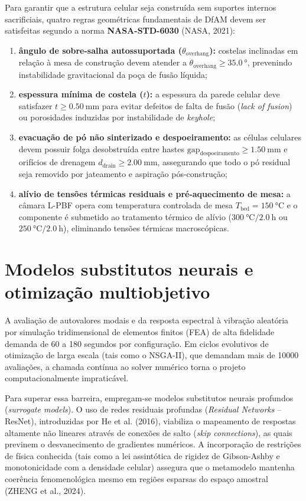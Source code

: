 Para garantir que a estrutura celular seja construída sem suportes internos sacrificiais, quatro regras geométricas fundamentais de DfAM devem ser satisfeitas segundo a norma \textbf{NASA-STD-6030} (NASA, 2021):
\begin{enumerate}
  \item \textbf{ângulo de sobre-salha autossuportada ($\theta_{\text{overhang}}$):} costelas inclinadas em relação à mesa de construção devem atender a $\theta_{\text{overhang}} \ge \SI{35.0}{\degree}$, prevenindo instabilidade gravitacional da poça de fusão líquida;
  \item \textbf{espessura mínima de costela ($t$):} a espessura da parede celular deve satisfazer $t \ge \SI{0.50}{\milli\metre}$ para evitar defeitos de falta de fusão (\textit{lack of fusion}) ou porosidades induzidas por instabilidade de \textit{keyhole};
  \item \textbf{evacuação de pó não sinterizado e despoeiramento:} as células celulares devem possuir folga desobstruída entre hastes $\text{gap}_{\text{despoeiramento}} \ge \SI{1.50}{\milli\metre}$ e orifícios de drenagem $d_{\text{drain}} \ge \SI{2.00}{\milli\metre}$, assegurando que todo o pó residual seja removido por jateamento e aspiração pós-construção;
  \item \textbf{alívio de tensões térmicas residuais e pré-aquecimento de mesa:} a câmara L-PBF opera com temperatura controlada de mesa $T_{\text{bed}} = \SI{150}{\celsius}$ e o componente é submetido ao tratamento térmico de alívio ($\SI{300}{\celsius} / \SI{2.0}{\hour}$ ou $\SI{250}{\celsius} / \SI{2.0}{\hour}$), eliminando tensões térmicas macroscópicas.
\end{enumerate}


\section{Modelos substitutos neurais e otimização multiobjetivo}
\label{sec:rev-neural-otimizacao}

A avaliação de autovalores modais e da resposta espectral à vibração aleatória por simulação tridimensional de elementos finitos (FEA) de alta fidelidade demanda de 60 a 180 segundos por configuração. Em ciclos evolutivos de otimização de larga escala (tais como o NSGA-II), que demandam mais de \num{10000} avaliações, a chamada contínua ao solver numérico torna o projeto computacionalmente impraticável.

Para superar essa barreira, empregam-se modelos substitutos neurais profundos (\textit{surrogate models}). O uso de redes residuais profundas (\textit{Residual Networks} -- ResNet), introduzidas por He et al. (2016), viabiliza o mapeamento de respostas altamente não lineares através de conexões de salto (\textit{skip connections}), as quais previnem o desvanecimento de gradientes numéricos. A incorporação de restrições de física conhecida (tais como a lei assintótica de rigidez de Gibson-Ashby e monotonicidade com a densidade celular) assegura que o metamodelo mantenha coerência fenomenológica mesmo em regiões esparsas do espaço amostral (ZHENG et al., 2024).

